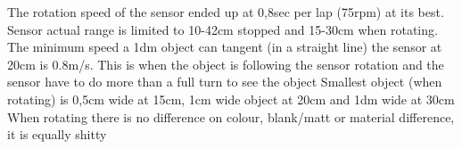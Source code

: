 The rotation speed of the sensor ended up at 0,8sec per lap (75rpm) at its best. 
Sensor actual range is limited to 10-42cm stopped and 15-30cm when rotating.
The minimum speed a 1dm object can tangent (in a straight line) the sensor at 20cm is 0.8m/s. This is when the object is following the sensor rotation and the sensor have to do more than a full turn to see the object
Smallest object (when rotating) is 0,5cm wide at 15cm, 1cm wide object at 20cm and 1dm wide at 30cm
When rotating there is no difference on colour, blank/matt or material difference, it is equally shitty
